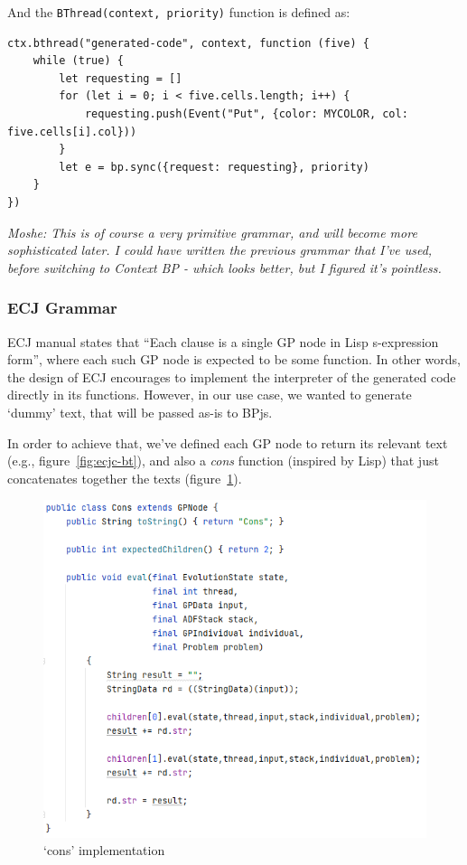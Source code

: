 \documentclass{article}
\newcommand{\code}{\texttt}
\begin{document}
    And the \code{BThread(context, priority)} function is defined as:

    \begin{verbatim}
ctx.bthread("generated-code", context, function (five) {
    while (true) {
        let requesting = []
        for (let i = 0; i < five.cells.length; i++) {
            requesting.push(Event("Put", {color: MYCOLOR, col: five.cells[i].col}))
        }
        let e = bp.sync({request: requesting}, priority)
    }
})
    \end{verbatim}

    \emph{Moshe: This is of course a very primitive grammar, and will become more sophisticated later. I could have written
    the previous grammar that I've used, before switching to Context BP - which looks better, but I figured it's pointless.}


    \subsubsection{ECJ Grammar}
    ECJ manual states that ``Each clause is a single GP node in Lisp s-expression form'', where each such GP node is
    expected to be some function.
    In other words, the design of ECJ encourages to implement the interpreter of the generated code directly in its
    functions.
    However, in our use case, we wanted to generate `dummy' text, that will be passed as-is to BPjs.

    In order to achieve that, we've defined each GP node to return its relevant text (e.g., figure~\ref{fig:ecjc-bt}),
    and also a \emph{cons} function (inspired by Lisp) that just concatenates together the texts (figure~\ref{fig:ecjc-cons}).

    \begin{figure}[htbp]
        \includegraphics[width=\textwidth]{ecj-cons}
        \caption{`cons' implementation}
        \label{fig:ecjc-cons}
    \end{figure}
\end{document}
